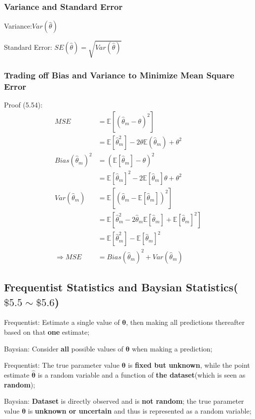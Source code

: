 \documentclass[12pt]{article}
\numberwithin{equation}{section}
\begin{document}
\subsubsection{Variance and Standard Error}
Variance:$ Var(\hat{\theta})$

Standard Error: $SE(\hat{\theta})=\sqrt{Var(\hat{\theta})}$

\subsubsection{Trading off Bias and Variance to Minimize Mean Square Error}

Proof (5.54):
\begin{align*}
MSE
&=\mathbb{E}[(\hat{\theta}_m-\theta)^2] \\
&=\mathbb{E}[\hat{\theta}_m^2]-2\theta\mathbb{E}(\hat{\theta}_m)+\theta^2 \\
Bias(\hat{\theta}_m)^2
&=(\mathbb{E}[\hat{\theta}_m]-\theta)^2 \\
&=\mathbb{E}[\hat{\theta}_m]^2-2\mathbb{E}[\hat{\theta}_m]\theta+\theta^2 \\
Var(\hat{\theta}_m)
&=\mathbb{E}[(\hat{\theta}_m-\mathbb{E}[\hat{\theta}_m])^2]\\
&=\mathbb{E}[\hat{\theta}_m^2-2\hat{\theta}_m\mathbb{E}[\hat{\theta}_m]+\mathbb{E}[\hat{\theta}_m]^2]\\
&=\mathbb{E}[\hat{\theta}_m^2]-\mathbb{E}[\hat{\theta}_m]^2\\
\Rightarrow
MSE&=Bias(\hat{\theta}_m)^2+Var(\hat{\theta}_m)
\end{align*}
\subsection{Frequentist Statistics and Baysian Statistics($\$5.5 \sim \$5.6$)}
Frequentist: Estimate a single value of $\boldsymbol\theta$, then making all predictions 
thereafter based on that \textbf{one} estimate;

Baysian: Consider \textbf{all} possible values of $\boldsymbol\theta$ when making a prediction;

Frequentist: The true parameter value $\boldsymbol\theta$ is \textbf{fixed but unknown}, while the point estimate $\hat{\boldsymbol\theta}$ is a random variable and a function of \textbf{the dataset}(which is seen as \textbf{random});

Baysian: \textbf{Dataset} is directly observed and is \textbf{not random}; the true parameter value $\boldsymbol\theta$ is \textbf{unknown or uncertain} and thus is represented as a random variable;
\end{document}
